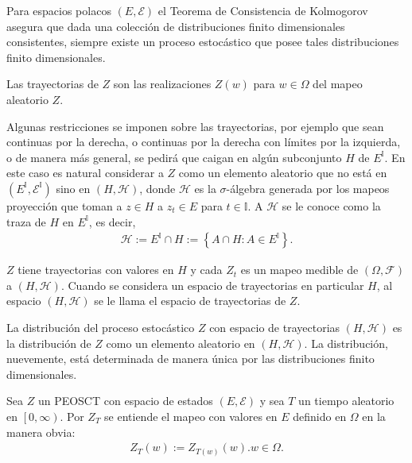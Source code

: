 \begin{Note}
Para espacios polacos $\left(E,\mathcal{E}\right)$ el Teorema de Consistencia de Kolmogorov asegura que dada una colecci\'on de distribuciones finito dimensionales consistentes, siempre existe un proceso estoc\'astico que posee tales distribuciones finito dimensionales.
\end{Note}


\begin{Def}
Las trayectorias de $Z$ son las realizaciones $Z\left(w\right)$ para $w\in\Omega$ del mapeo aleatorio $Z$.
\end{Def}

\begin{Note}
Algunas restricciones se imponen sobre las trayectorias, por ejemplo que sean continuas por la derecha, o continuas por la derecha con l\'imites por la izquierda, o de manera m\'as general, se pedir\'a que caigan en alg\'un subconjunto $H$ de $E^{\mathbb{I}}$. En este caso es natural considerar a $Z$ como un elemento aleatorio que no est\'a en $\left(E^{\mathbb{I}},\mathcal{E}^{\mathbb{I}}\right)$ sino en $\left(H,\mathcal{H}\right)$, donde $\mathcal{H}$ es la $\sigma$-\'algebra generada por los mapeos proyecci\'on que toman a $z\in H$ a $z_{t}\in E$ para $t\in\mathbb{I}$. A $\mathcal{H}$ se le conoce como la traza de $H$ en $E^{\mathbb{I}}$, es decir,
\begin{eqnarray}
\mathcal{H}:=E^{\mathbb{I}}\cap H:=\left\{A\cap H:A\in E^{\mathbb{I}}\right\}.
\end{eqnarray}
\end{Note}


\begin{Note}
$Z$ tiene trayectorias con valores en $H$ y cada $Z_{t}$ es un mapeo medible de $\left(\Omega,\mathcal{F}\right)$ a $\left(H,\mathcal{H}\right)$. Cuando se considera un espacio de trayectorias en particular $H$, al espacio $\left(H,\mathcal{H}\right)$ se le llama el espacio de trayectorias de $Z$.
\end{Note}

\begin{Note}
La distribuci\'on del proceso estoc\'astico $Z$ con espacio de trayectorias $\left(H,\mathcal{H}\right)$ es la distribuci\'on de $Z$ como  un elemento aleatorio en $\left(H,\mathcal{H}\right)$. La distribuci\'on, nuevemente, est\'a determinada de manera \'unica por las distribuciones finito dimensionales.
\end{Note}


\begin{Def}
Sea $Z$ un PEOSCT  con espacio de estados $\left(E,\mathcal{E}\right)$ y sea $T$ un tiempo aleatorio en $\left[0,\infty\right)$. Por $Z_{T}$ se entiende el mapeo con valores en $E$ definido en $\Omega$ en la manera obvia:
\begin{eqnarray*}
Z_{T}\left(w\right):=Z_{T\left(w\right)}\left(w\right). w\in\Omega.
\end{eqnarray*}
\end{Def}


